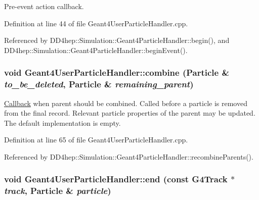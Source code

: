 Pre-\/event action callback. 

Definition at line 44 of file Geant4UserParticleHandler.cpp.

Referenced by DD4hep::Simulation::Geant4ParticleHandler::begin(), and DD4hep::Simulation::Geant4ParticleHandler::beginEvent().\hypertarget{class_d_d4hep_1_1_simulation_1_1_geant4_user_particle_handler_a8951aad04c7aaeb0ba39ef9e32d372cd}{
\subsubsection[{combine}]{\setlength{\rightskip}{0pt plus 5cm}void Geant4UserParticleHandler::combine ({\bf Particle} \& {\em to\_\-be\_\-deleted}, \/  {\bf Particle} \& {\em remaining\_\-parent})}}
\label{class_d_d4hep_1_1_simulation_1_1_geant4_user_particle_handler_a8951aad04c7aaeb0ba39ef9e32d372cd}


\hyperlink{class_d_d4hep_1_1_callback}{Callback} when parent should be combined. Called before a particle is removed from the final record. Relevant particle properties of the parent may be updated. The default implementation is empty. 

Definition at line 65 of file Geant4UserParticleHandler.cpp.

Referenced by DD4hep::Simulation::Geant4ParticleHandler::recombineParents().\hypertarget{class_d_d4hep_1_1_simulation_1_1_geant4_user_particle_handler_a327d267d834a00157ebd0b1e99e1685c}{
\subsubsection[{end}]{\setlength{\rightskip}{0pt plus 5cm}void Geant4UserParticleHandler::end (const G4Track $\ast$ {\em track}, \/  {\bf Particle} \& {\em particle})}}
\label{class_d_d4hep_1_1_simulation_1_1_geant4_user_particle_handler_a327d267d834a00157ebd0b1e99e1685c}


